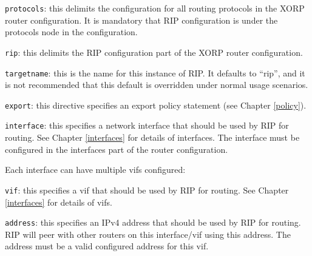 \begin{description}
\item{\tt protocols}: this delimits the configuration for all routing
  protocols in the XORP router configuration.  It is mandatory that
  RIP configuration is under the {\stt protocols} node in the
  configuration.
\item{\tt rip}: this delimits the RIP configuration part of the XORP
  router configuration.
\item{\tt targetname}: this is the name for this instance of RIP.  It
  defaults to ``{\stt rip}'', and it is not recommended that this
  default is overridden under normal usage scenarios.
\item{\tt export}: this directive specifies an export policy statement
(see Chapter \ref{policy}).
\item{\tt interface}: this specifies a network interface that should
  be used by RIP for routing.  See Chapter \ref{interfaces} for
  details of interfaces.  The interface must be configured
  in the {\stt interfaces} part of the router configuration.

  Each interface can have multiple vifs configured:
\item{\tt vif}: this specifies a vif that should be used by RIP for routing.
  See Chapter \ref{interfaces} for details of vifs.
\item{\tt address}: this specifies an IPv4 address that should be used
  by RIP for routing.  RIP will peer with other routers on this {\stt
  interface/vif} using this {\stt address}.  The address must be a
  valid configured address for this vif.


\end{description}
